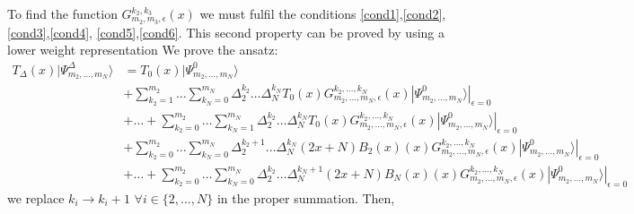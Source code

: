 \documentclass[11pt]{article}
\numberwithin{equation}{section}
\numberwithin{equation}{subsection}
\begin{document}
To find the function $G_{m_{2},m_{3},\epsilon}^{k_{2},k_{3}}(x)$ we must fulfil the conditions \eqref{cond1},\eqref{cond2},\eqref{cond3},\eqref{cond4}, \eqref{cond5},\eqref{cond6}.
{\color{blue}This second property can be proved by using a lower weight representation }
We prove the ansatz:
\begin{align*}
	T_{\Delta}(x)|\Psi_{m_{2},\ldots,m_{N}}^{\Delta}\rangle&=T_{0}(x)|\Psi_{m_{2},\ldots,m_{N}}^{0}\rangle
	\\&+
	\sum_{k_{2}=1}^{m_{2}}\ldots\sum_{k_{N}=0}^{m_{N}}\Delta_{2}^{k_{2}}\ldots \Delta_{N}^{k_{N}}T_{0}(x)G_{m_{2},\ldots,m_{N},\epsilon}^{k_{2},\ldots,k_{N}}(x)|\Psi_{m_{2},\ldots,m_{N}}^{0}\rangle|_{\epsilon=0}
	\\&+\ldots+	\sum_{k_{2}=0}^{m_{2}}\ldots\sum_{k_{N}=1}^{m_{N}}\Delta_{2}^{k_{2}}\ldots \Delta_{N}^{k_{N}}T_{0}(x)G_{m_{2},\ldots,m_{N},\epsilon}^{k_{2},\ldots,k_{N}}(x)|\Psi_{m_{2},\ldots,m_{N}}^{0}\rangle|_{\epsilon=0} 
	\\&+\sum_{k_{2}=0}^{m_{2}}\ldots\sum_{k_{N}=0}^{m_{N}}\Delta_{2}^{k_{2}+1}\ldots \Delta_{N}^{k_{N}}(2x+N)B_{2}(x)(x)G_{m_{2},\ldots,m_{N},\epsilon}^{k_{2},\ldots,k_{N}}(x)|\Psi_{m_{2},\ldots,m_{N}}^{0}\rangle|_{\epsilon=0}
	\\&+\ldots +
	\sum_{k_{2}=0}^{m_{2}}\ldots\sum_{k_{N}=0}^{m_{N}}\Delta_{2}^{k_{2}}\ldots \Delta_{N}^{k_{N}+1}(2x+N)B_{N}(x)(x)G_{m_{2},\ldots,m_{N},\epsilon}^{k_{2},\ldots,k_{N}}(x)|\Psi_{m_{2},\ldots,m_{N}}^{0}\rangle|_{\epsilon=0}
\end{align*}
we replace $k_{i}\to k_{i}+1$ $\forall i\in\{2,\ldots,N\}$ in the proper summation. Then,
\end{document}
